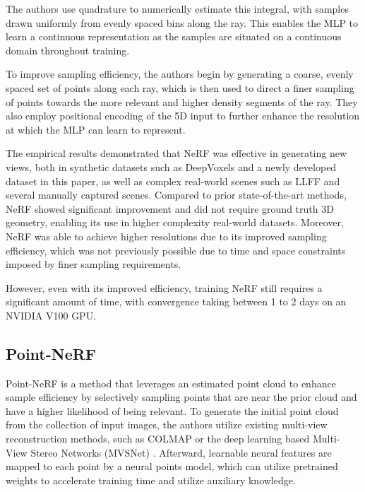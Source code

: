 \documentclass[10pt,twocolumn,letterpaper]{article}
\begin{document}
The authors use quadrature to numerically estimate this integral, with samples drawn uniformly from evenly spaced bins along the ray. This enables the MLP to learn a continuous representation as the samples are situated on a continuous domain throughout training.

To improve sampling efficiency, the authors begin by generating a coarse, evenly spaced set of points along each ray, which is then used to direct a finer sampling of points towards the more relevant and higher density segments of the ray. They also employ positional encoding of the 5D input to further enhance the resolution at which the MLP can learn to represent.

The empirical results demonstrated that NeRF was effective in generating new views, both in synthetic datasets such as DeepVoxels and a newly developed dataset in this paper, as well as complex real-world scenes such as LLFF and several manually captured scenes. Compared to prior state-of-the-art methods, NeRF showed significant improvement and did not require ground truth 3D geometry, enabling its use in higher complexity real-world datasets. Moreover, NeRF was able to achieve higher resolutions due to its improved sampling efficiency, which was not previously possible due to time and space constraints imposed by finer sampling requirements. 

However, even with its improved efficiency, training NeRF still requires a significant amount of time, with convergence taking between 1 to 2 days on an NVIDIA V100 GPU. 



\subsection{Point-NeRF}
Point-NeRF \cite{PointNeRF} is a method that leverages an estimated point cloud to enhance sample efficiency by selectively sampling points that are near the prior cloud and have a higher likelihood of being relevant. To generate the initial point cloud from the collection of input images, the authors utilize existing multi-view reconstruction methods, such as COLMAP \cite{COLMAP} or the deep learning based Multi-View Stereo Networks (MVSNet) \cite{MVSNet}. Afterward, learnable neural features are mapped to each point by a neural points model, which can utilize pretrained weights to accelerate training time and utilize auxiliary knowledge. 
\end{document}

